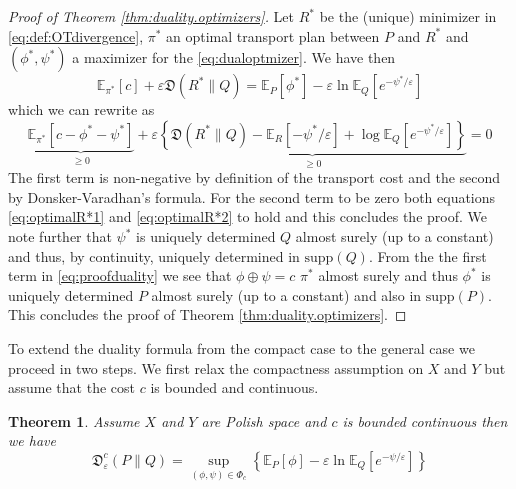 \documentclass{amsart}
\newtheorem{theorem}{Theorem}[section]
\theoremstyle{definition}
\theoremstyle{remark}
\numberwithin{equation}{section}
\begin{document}
\begin{proof}[Proof of Theorem \ref{thm:duality.optimizers}]
Let $R^*$ be the (unique) minimizer in \eqref{eq:def:OTdivergence}, 
$\pi^*$ an optimal transport plan between $P$ and $R^*$ and $(\phi^*,\psi^*)$ a maximizer for the \eqref{eq:dualoptmizer}.
We have then 
\begin{equation}
 \mathbb{E}_{\pi^*}[c] + \varepsilon \mathfrak{D}(R^*\|Q) = \mathbb{E}_P[\phi^*] -\varepsilon \ln \mathbb{E}_Q[e^{-\psi^*/\varepsilon}]
\end{equation}
which we can rewrite as 
\begin{equation}
\underbrace{ \mathbb{E}_{\pi^*}[c - \phi^* - \psi^*]
 }_{\ge 0}+ \varepsilon 
 \underbrace{\left\{ \mathfrak{D}(R^*\|Q) -  \mathbb{E}_{R}[-\psi^*/\varepsilon] + \log \mathbb{E}_Q[e^{-\psi^*/\varepsilon}] \right\}
 }_{\ge 0} = 0
\end{equation}
The first term is non-negative by definition of the transport cost and the second by Donsker-Varadhan's formula.  For the second term to be zero both equations \eqref{eq:optimalR*1} 
and \eqref{eq:optimalR*2} to hold and this concludes the proof.  We note further that $\psi^*$ is uniquely determined $Q$ almost surely (up to a constant) and thus, by continuity,  uniquely determined in $\textrm{supp}(Q)$.
From the
the first term in \eqref{eq:proofduality} we see that $\phi\oplus \psi=c$ $\pi^*$ almost surely and thus $\phi^*$ is uniquely determined $P$ almost surely (up to a constant) and also in $\textrm{supp} (P)$. 
This concludes the proof of Theorem \ref{thm:duality.optimizers}. 
\end{proof}


To extend the duality formula from the compact case to the general case we proceed in two steps.  We first relax the compactness assumption on $X$ and $Y$ but  assume that the cost $c$ is bounded and continuous.    

\begin{theorem}\label{thm:duality.bounded} Assume $X$ and $Y$ are Polish space and $c$ is bounded continuous
then we have 
\begin{equation}
\mathfrak{D}^c_\varepsilon(P\|Q) = \sup_{(\phi,\psi)\in \Phi_c} \left\{ \mathbb{E}_P[\phi] - \varepsilon\ln \mathbb{E}_Q[e^{-\psi/\varepsilon}] \right\}
\end{equation}
\end{theorem}
\end{document}
